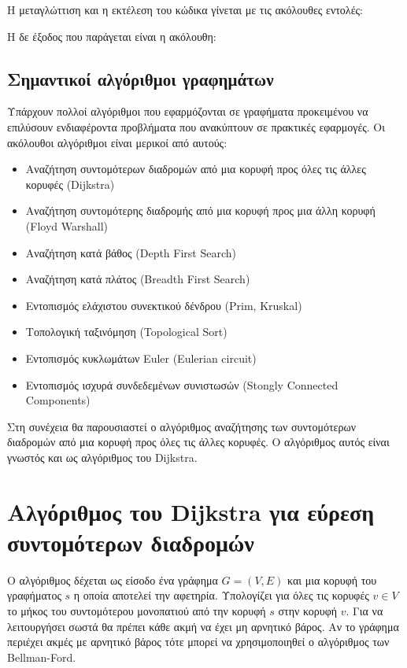 



Η μεταγλώττιση και η εκτέλεση του κώδικα γίνεται με τις ακόλουθες εντολές:



Η δε έξοδος που παράγεται είναι η ακόλουθη:



\subsection{Σημαντικοί αλγόριθμοι γραφημάτων}
Υπάρχουν πολλοί αλγόριθμοι που εφαρμόζονται σε γραφήματα προκειμένου να επιλύσουν ενδιαφέροντα προβλήματα που ανακύπτουν σε πρακτικές εφαρμογές. Οι ακόλουθοι αλγόριθμοι είναι μερικοί από αυτούς:
\begin{itemize}[noitemsep]
	\item Αναζήτηση συντομότερων διαδρομών από μια κορυφή προς όλες τις άλλες κορυφές (Dijkstra)
	\item Αναζήτηση συντομότερης διαδρομής από μια κορυφή προς μια άλλη κορυφή (Floyd Warshall)
	\item Αναζήτηση κατά βάθος (Depth First Search)
	\item Αναζήτηση κατά πλάτος (Breadth First Search)
	\item Εντοπισμός ελάχιστου συνεκτικού δένδρου (Prim, Kruskal)
	\item Τοπολογική ταξινόμηση (Topological Sort)
	\item Εντοπισμός κυκλωμάτων Euler (Eulerian circuit)
	\item Εντοπισμός ισχυρά συνδεδεμένων συνιστωσών (Stongly Connected Components)
\end{itemize} 

Στη συνέχεια θα παρουσιαστεί ο αλγόριθμος αναζήτησης των συντομότερων διαδρομών από μια κορυφή προς όλες τις άλλες κορυφές. Ο αλγόριθμος αυτός είναι γνωστός και ως αλγόριθμος του Dijkstra.
 
\section{Αλγόριθμος του Dijkstra για εύρεση συντομότερων διαδρομών}
Ο αλγόριθμος δέχεται ως είσοδο ένα γράφημα $G=(V,E)$ και μια κορυφή του γραφήματος $s$ η οποία αποτελεί την αφετηρία. Υπολογίζει για όλες τις κορυφές $v \in V$ το μήκος του συντομότερου μονοπατιού από την κορυφή $s$ στην κορυφή $v$. Για να λειτουργήσει σωστά θα πρέπει κάθε ακμή να έχει μη αρνητικό βάρος. Αν το γράφημα περιέχει ακμές με αρνητικό βάρος τότε μπορεί να χρησιμοποιηθεί ο αλγόριθμος των Bellman-Ford.

